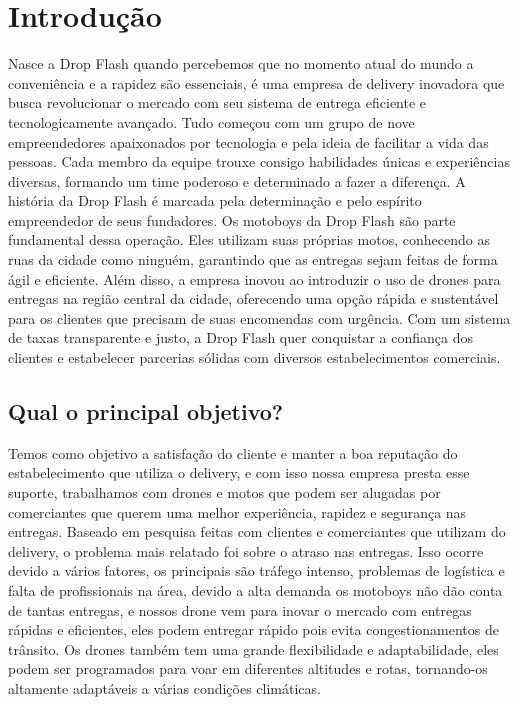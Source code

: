 \chapter{Introdução}
\label{ch:introducao}

     Nasce a Drop Flash quando percebemos que no momento atual do mundo a conveniência e a rapidez são essenciais, é uma empresa de delivery inovadora que busca revolucionar o mercado com seu sistema de entrega eficiente e tecnologicamente avançado. Tudo começou com um grupo de nove empreendedores apaixonados por tecnologia e pela ideia de facilitar a vida das pessoas. Cada membro da equipe trouxe consigo habilidades únicas e experiências diversas, formando um time poderoso e determinado a fazer a diferença. A história da Drop Flash é marcada pela determinação e pelo espírito empreendedor de seus fundadores. Os motoboys da Drop Flash são parte fundamental dessa operação. Eles utilizam suas próprias motos, conhecendo as ruas da cidade como ninguém, garantindo que as entregas sejam feitas de forma ágil e eficiente. Além disso, a empresa inovou ao introduzir o uso de drones para entregas na região central da cidade, oferecendo uma opção rápida e sustentável para os clientes que precisam de suas encomendas com urgência. Com um sistema de taxas transparente e justo, a Drop Flash quer conquistar a confiança dos clientes e estabelecer parcerias sólidas com diversos estabelecimentos comerciais. \\

     \section{Qual o principal objetivo?}
Temos como objetivo a satisfação do cliente e manter a boa reputação do estabelecimento que utiliza o delivery, e com isso nossa empresa presta esse suporte, trabalhamos com drones e motos que podem ser alugadas por comerciantes que querem uma melhor experiência, rapidez e segurança nas entregas. Baseado em pesquisa feitas com clientes e comerciantes que utilizam do delivery, o problema mais relatado foi sobre o atraso nas entregas. Isso ocorre devido a vários fatores, os principais são tráfego intenso, problemas de logística e falta de profissionais na área, devido a alta demanda os motoboys não dão conta de tantas entregas, e nossos drone vem para inovar o mercado com entregas rápidas e eficientes, eles podem entregar rápido pois evita congestionamentos de trânsito. Os drones também tem uma grande flexibilidade e adaptabilidade, eles podem ser programados para voar em diferentes altitudes e rotas, tornando-os altamente adaptáveis a várias condições climáticas.
     
